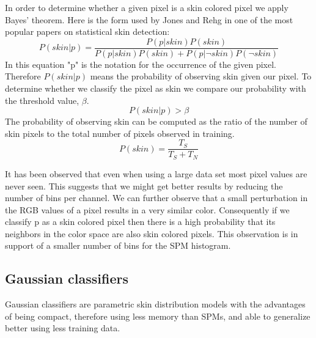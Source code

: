 \documentclass[12pt]{report}
\begin{document}
	In order to determine whether a given pixel is a skin colored pixel we apply Bayes' theorem. Here is the form used by Jones and Rehg\cite{compaq} in one of the most popular papers on statistical skin detection:
	\begin{equation}
	P(skin|p) = \frac{P(p|skin)P(skin)}{P(p|skin)P(skin) + P(p|\neg skin)P(\neg skin)}
	\end{equation}
	In this equation "p" is the notation for the occurrence of the given pixel. Therefore $P(skin|p)$ means the probability of observing skin given our pixel. To determine whether we classify the pixel as skin we compare our probability with the threshold value, \( \beta \).
	\begin{equation}
	P(skin|p) > \beta
	\end{equation}
	The probability of observing skin can be computed as the ratio of the number of skin pixels to the total number of pixels observed in training.
	\begin{equation}
	P(skin) = \frac{T_S}{T_S + T_N}
	\end{equation}

	It has been observed that even when using a large data set most pixel values are never seen\cite{compaq}. This suggests that we might get better results by reducing the number of bins per channel. We can further observe that a small perturbation in the RGB values of a pixel results in a very similar color. Consequently if we classify p as a skin colored pixel then there is a high probability that its neighbors in the color space are also skin colored pixels. This observation is in support of a smaller number of bins for the SPM histogram. 
	
	\subsection{Gaussian classifiers}
	Gaussian classifiers are parametric skin distribution models with the advantages of being compact, therefore using less memory than SPMs, and able to generalize better using less training data\cite{survey_skin_color_modeling}.
	
\end{document}
